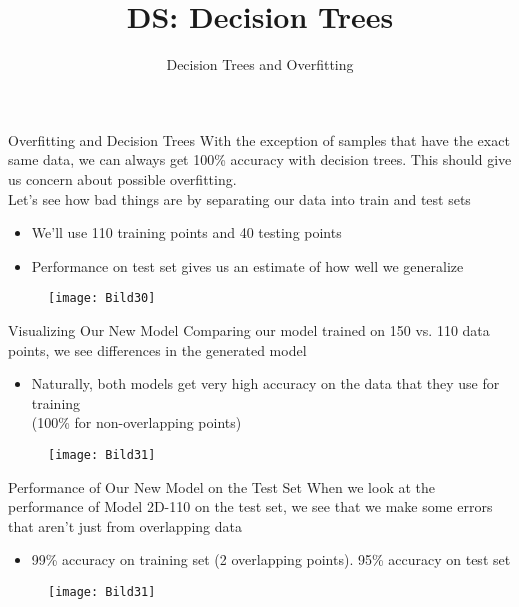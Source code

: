 \documentclass[aspectratio=169]{../latex_main/tntbeamer}  %
\title[Introduction]{DS: Decision Trees}
\subtitle{Decision Trees and Overfitting}
\begin{document}
	
	\maketitle
	\begin{frame}{Overfitting and Decision Trees}
	    With the exception of samples that have the exact same data, we can always get 100\% accuracy with decision trees. This should give us concern about possible overfitting.\\
	    \bigskip
	    Let’s see how bad things are by separating our data into train and test sets
	    \begin{itemize}
	        \item We’ll use 110 training points and 40 testing points
	        \item Performance on test set gives us an estimate of how well we generalize
	    \end{itemize}
	    \begin{figure}
	        \centering
	        \texttt{[image: Bild30]}
	    \end{figure}
	\end{frame}
	
	\begin{frame}{Visualizing Our New Model}
	   Comparing our model trained on 150 vs. 110 data points, we see differences in the generated model\\
	    \begin{itemize}
	        \item Naturally, both models get very high accuracy on the data that they use for training\\ (100\% for non-overlapping points)
	    \end{itemize}
	    \begin{figure}
	        \centering
	        \texttt{[image: Bild31]}
	    \end{figure}
	\end{frame}
	
	
	\begin{frame}{Performance of Our New Model on the Test Set}
	  When we look at the performance of Model 2D-110 on the test set, we see that we make some errors that aren’t just from overlapping data\\
	    \begin{itemize}
	        \item 99\% accuracy on training set (2 overlapping points). 95\% accuracy on test set
	    \end{itemize}
	    \begin{figure}
	        \centering
	        \texttt{[image: Bild31]}
	    \end{figure}
	\end{frame}
	
\end{document}
